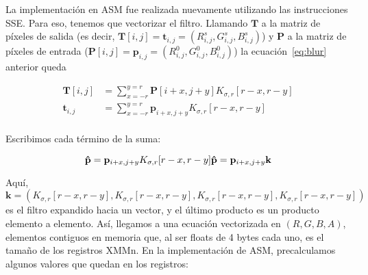 La implementación en ASM fue realizada nuevamente utilizando las
instrucciones {\ttfamily SSE}. Para eso, tenemos que vectorizar el
filtro. Llamando $\mathbf{T}$ a la matriz de píxeles de salida (es decir,
$\mathbf{T}[i, j] = \mathbf{t}_{i, j} = (R^s_{i, j}, G^s_{i, j},
B^s_{i, j})$)
y $\mathbf{P}$ a la matriz de píxeles de entrada
($\mathbf{P}[i, j] = \mathbf{p}_{i, j} = (R^0_{i, j}, G^0_{i, j},
B^0_{i, j})$) la ecuación~\ref{eq:blur} anterior queda

\begin{align}
  \mathbf{T}[i, j] &= \sum_{x=-r}^{y=r} \mathbf{P}[i+x, j+y] K_{\sigma,
                     r} [r-x, r-y] \\
  \mathbf{t}_{i, j} &= \sum_{x=-r}^{y=r} \mathbf{p}_{i+x, j+y} K_{\sigma,
                     r}[r-x, r-y]\\
\end{align}

Escribimos cada término de la suma:

\begin{equation}
  \mathbf{\hat{p}} = \mathbf{p}_{i+x, j+y} K_{\sigma, r}[r-x, r-y] \\
  \mathbf{\hat{p}} = \mathbf{p}_{i+x, j+y} \mathbf{k} 
  \label{eq:blur_vec}
\end{equation}

Aquí,
$\mathbf{k} = (K_{\sigma, r}[r-x, r-y], K_{\sigma, r}[r-x, r-y],
K_{\sigma, r}[r-x, r-y], K_{\sigma, r}[r-x, r-y])$
es el filtro expandido hacia un vector, y el último producto es un
producto elemento a elemento. Así, llegamos a una ecuación vectorizada
en $(R, G, B, A)$, elementos contiguos en memoria que, al ser floats
de 4 bytes cada uno, es el tamaño de los registros {\ttfamily
  XMMn}. En la implementación de ASM, precalculamos algunos valores
que quedan en los registros:


